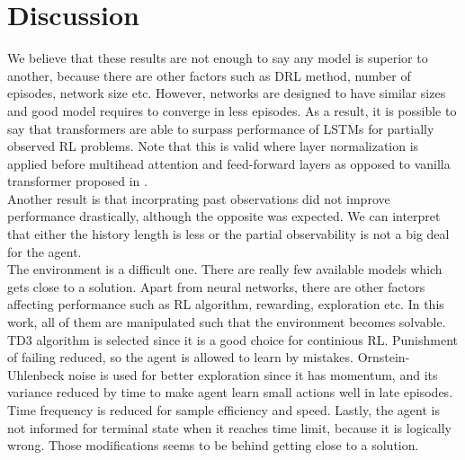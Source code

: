 \section{Discussion}
We believe that these results are not enough to say any model is superior to another, because there are other factors such as DRL method, number of episodes, network size etc. However, networks are designed to have similar sizes and good model requires to converge in less episodes. As a result, it is possible to say that transformers are able to surpass performance of LSTMs for partially observed RL problems. Note that this is valid where layer normalization is applied before multihead attention and feed-forward layers \cite{xiong_layer_2020} as opposed to vanilla transformer proposed in \cite{vaswani_attention_2017}. \\
Another result is that incorprating past observations did not improve performance drastically, although the opposite was expected. We can interpret that either the history length is less or the partial observability is not a big deal for the agent. \\
The environment is a difficult one. There are really few available models which gets close to a solution. Apart from neural networks, there are other factors affecting performance such as RL algorithm, rewarding, exploration etc. In this work, all of them are manipulated such that the environment becomes solvable. TD3 algorithm is selected since it is a good choice for continious RL. Punishment of failing reduced, so the agent is allowed to learn by mistakes. Ornstein-Uhlenbeck noise is used for better exploration since it has momentum, and its variance reduced by time to make agent learn small actions well in late episodes. Time frequency is reduced for sample efficiency and speed. Lastly, the agent is not informed for terminal state when it reaches time limit, because it is logically wrong. Those modifications seems to be behind getting close to a solution. \\  
